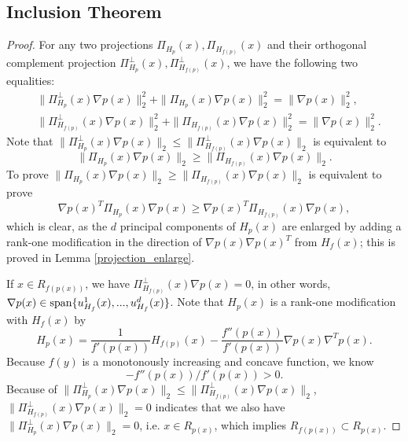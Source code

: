 \documentclass[aos,preprint]{imsart}
\theoremstyle{remark}
\begin{document}
\begin{appendix}
\subsection{Inclusion Theorem}
\begin{proof}
For any two projections $\Pi_{H_p}(x), \Pi_{H_{f(p)}}(x)$ and their orthogonal complement projection $\Pi^\perp_{H_p}(x), \Pi^\perp_{H_{f(p)}}(x)$, we have the following two equalities:
\[
\begin{aligned}
&\|\Pi_{H_p}^{\perp}(x) \nabla p(x)\|_2^2 +\|\Pi_{H_p}(x) \nabla p(x)\|_2^2 = \|\nabla p(x)\|_2^2,\\
&\|\Pi_{H_{f(p)}}^{\perp}(x) \nabla p(x)\|_2^2 +\|\Pi_{H_{f(p)}}(x) \nabla p(x)\|_2^2 = \|\nabla p(x)\|_2^2.
\end{aligned}
\] 
Note that $\|\Pi_{H_p}^{\perp}(x)\nabla p(x)\|_2 \leq \|\Pi_{H_{f(p)}}^{\perp}(x)\nabla p(x)\|_2$ is equivalent to \[
\|\Pi_{H_p}(x)\nabla p(x)\|_2 \geq \|\Pi_{H_{f(p)}}(x)\nabla p(x)\|_2.\] To prove $\|\Pi_{H_p}(x)\nabla p(x)\|_2 \geq \|\Pi_{H_{f(p)}}(x)\nabla p(x)\|_2$ is equivalent to prove 
\begin{equation}\label{relationHF}
\nabla p(x)^T \Pi_{H_p}(x) \nabla p(x)\geq \nabla p(x)^T \Pi_{H_{f(p)}}(x) \nabla p(x),
\end{equation} 
which is clear, as the $d$ principal components of $H_p(x)$ are enlarged by adding a rank-one modification in the direction of $\nabla p(x)\nabla p(x)^T$ from $H_f(x)$; this is proved in Lemma \ref{projection_enlarge}.

If $x\in R_{f(p(x))}$, we have $ \Pi_{H_{f(p)}}^{\perp} (x) \nabla p(x) = 0$, %
in other words, $\nabla p(x)\in {\rm span}\{u^{1}_{H_f}(x), ..., u^{d}_{H_f}(x) \}$. Note that $H_p(x)$ is a rank-one modification with $H_{f}(x)$ by 
\begin{equation}\label{rankone}
 H_{p}(x) =\frac{1}{ f'(p(x))} H_{f(p)}(x) - \frac{f''(p(x))}{ f'(p(x))} \nabla p(x) \nabla^T p(x) .
\end{equation}
 Because $f(y)$ is a monotonously increasing and concave function, we know 
\[
- f''(p(x))/f'(p(x))>0.
\] 
Because of $\|\Pi_{H_p}^\perp(x)\nabla p(x)\|_2 \leq \|\Pi_{H_{f(p)}}^{\perp}(x)\nabla p(x)\|_2$, $\|\Pi_{H_{f(p)}}^{\perp}(x)\nabla p(x)\|_2=0$ indicates that we also have $\|\Pi_{H_p}^\perp(x)\nabla p(x)\|_2=0$, i.e. $x \in R_{p(x)}$, which implies $R_{f(p(x))} \subset R_{p(x)}$. 



\end{proof}
\end{appendix}
\end{document}

